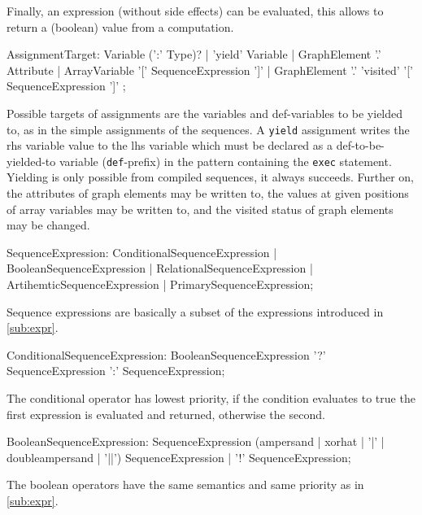 Finally, an expression (without side effects) can be evaluated, this allows to return a (boolean) value from a computation.

\begin{rail}
  AssignmentTarget: 
    Variable (':' Type)? |
    'yield' Variable |
    GraphElement '.' Attribute |
    ArrayVariable '[' SequenceExpression ']' |
    GraphElement '.' 'visited' '[' SequenceExpression ']'
;
\end{rail}

Possible targets of assignments are the variables and def-variables to be yielded to, as in the simple assignments of the sequences. 
A \texttt{yield} assignment writes the rhs variable value to the lhs variable which must be declared as a  def-to-be-yielded-to variable (\texttt{def}-prefix) in the pattern containing the \texttt{exec} statement.
Yielding is only possible from compiled sequences, it always succeeds.
Further on, the attributes of graph elements may be written to, the values at given positions of array variables may be written to, and the visited status of graph elements may be changed.

\begin{rail}
  SequenceExpression:  
    ConditionalSequenceExpression |
    BooleanSequenceExpression |
    RelationalSequenceExpression |
    ArtihemticSequenceExpression |
    PrimarySequenceExpression;
\end{rail}

Sequence expressions are basically a subset of the expressions introduced in \ref{sub:expr}.

\begin{rail}
  ConditionalSequenceExpression: 
    BooleanSequenceExpression '?' SequenceExpression ':' SequenceExpression;
\end{rail}

The conditional operator has lowest priority, if the condition evaluates to true the first expression is evaluated and returned, otherwise the second.

\begin{rail}
  BooleanSequenceExpression: 
    SequenceExpression (ampersand | xorhat | '|' | doubleampersand | '||') SequenceExpression |
    '!' SequenceExpression;
\end{rail}

The boolean operators have the same semantics and same priority as in \ref{sub:expr}.

